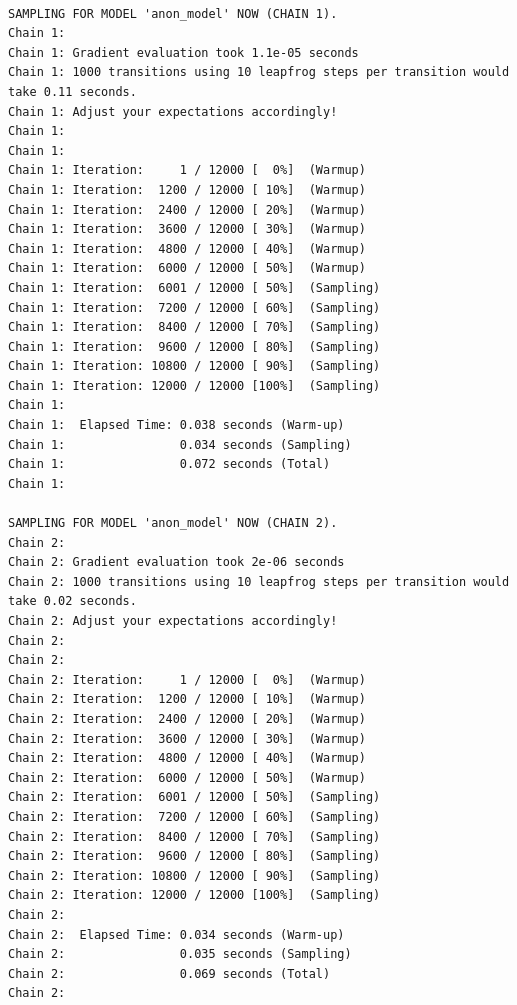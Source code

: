 \documentclass[
  letterpaper,
  DIV=11,
  numbers=noendperiod]{scrartcl}
\begin{document}
\begin{verbatim}

SAMPLING FOR MODEL 'anon_model' NOW (CHAIN 1).
Chain 1: 
Chain 1: Gradient evaluation took 1.1e-05 seconds
Chain 1: 1000 transitions using 10 leapfrog steps per transition would take 0.11 seconds.
Chain 1: Adjust your expectations accordingly!
Chain 1: 
Chain 1: 
Chain 1: Iteration:     1 / 12000 [  0%]  (Warmup)
Chain 1: Iteration:  1200 / 12000 [ 10%]  (Warmup)
Chain 1: Iteration:  2400 / 12000 [ 20%]  (Warmup)
Chain 1: Iteration:  3600 / 12000 [ 30%]  (Warmup)
Chain 1: Iteration:  4800 / 12000 [ 40%]  (Warmup)
Chain 1: Iteration:  6000 / 12000 [ 50%]  (Warmup)
Chain 1: Iteration:  6001 / 12000 [ 50%]  (Sampling)
Chain 1: Iteration:  7200 / 12000 [ 60%]  (Sampling)
Chain 1: Iteration:  8400 / 12000 [ 70%]  (Sampling)
Chain 1: Iteration:  9600 / 12000 [ 80%]  (Sampling)
Chain 1: Iteration: 10800 / 12000 [ 90%]  (Sampling)
Chain 1: Iteration: 12000 / 12000 [100%]  (Sampling)
Chain 1: 
Chain 1:  Elapsed Time: 0.038 seconds (Warm-up)
Chain 1:                0.034 seconds (Sampling)
Chain 1:                0.072 seconds (Total)
Chain 1: 

SAMPLING FOR MODEL 'anon_model' NOW (CHAIN 2).
Chain 2: 
Chain 2: Gradient evaluation took 2e-06 seconds
Chain 2: 1000 transitions using 10 leapfrog steps per transition would take 0.02 seconds.
Chain 2: Adjust your expectations accordingly!
Chain 2: 
Chain 2: 
Chain 2: Iteration:     1 / 12000 [  0%]  (Warmup)
Chain 2: Iteration:  1200 / 12000 [ 10%]  (Warmup)
Chain 2: Iteration:  2400 / 12000 [ 20%]  (Warmup)
Chain 2: Iteration:  3600 / 12000 [ 30%]  (Warmup)
Chain 2: Iteration:  4800 / 12000 [ 40%]  (Warmup)
Chain 2: Iteration:  6000 / 12000 [ 50%]  (Warmup)
Chain 2: Iteration:  6001 / 12000 [ 50%]  (Sampling)
Chain 2: Iteration:  7200 / 12000 [ 60%]  (Sampling)
Chain 2: Iteration:  8400 / 12000 [ 70%]  (Sampling)
Chain 2: Iteration:  9600 / 12000 [ 80%]  (Sampling)
Chain 2: Iteration: 10800 / 12000 [ 90%]  (Sampling)
Chain 2: Iteration: 12000 / 12000 [100%]  (Sampling)
Chain 2: 
Chain 2:  Elapsed Time: 0.034 seconds (Warm-up)
Chain 2:                0.035 seconds (Sampling)
Chain 2:                0.069 seconds (Total)
Chain 2: 


\end{verbatim}
\end{document}

